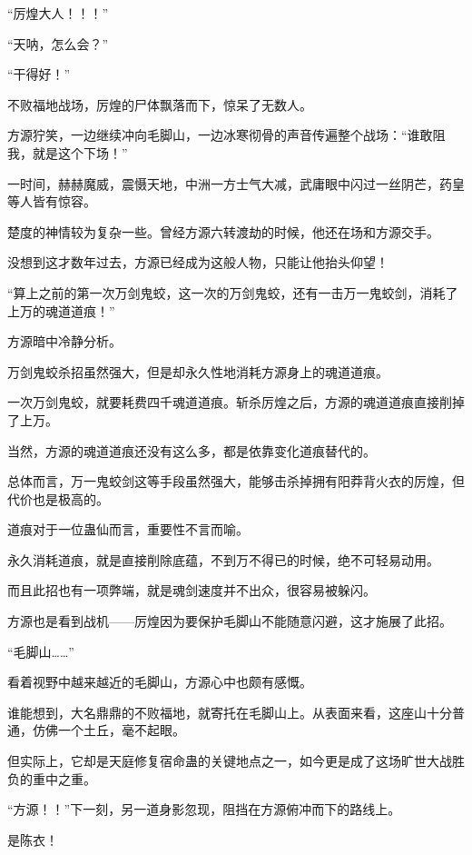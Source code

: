 
\begin{this_body}

“厉煌大人！！！”

“天呐，怎么会？”

“干得好！”

不败福地战场，厉煌的尸体飘落而下，惊呆了无数人。

方源狞笑，一边继续冲向毛脚山，一边冰寒彻骨的声音传遍整个战场：“谁敢阻我，就是这个下场！”

一时间，赫赫魔威，震慑天地，中洲一方士气大减，武庸眼中闪过一丝阴芒，药皇等人皆有惊容。

楚度的神情较为复杂一些。曾经方源六转渡劫的时候，他还在场和方源交手。

没想到这才数年过去，方源已经成为这般人物，只能让他抬头仰望！

“算上之前的第一次万剑鬼蛟，这一次的万剑鬼蛟，还有一击万一鬼蛟剑，消耗了上万的魂道道痕！”

方源暗中冷静分析。

万剑鬼蛟杀招虽然强大，但是却永久性地消耗方源身上的魂道道痕。

一次万剑鬼蛟，就要耗费四千魂道道痕。斩杀厉煌之后，方源的魂道道痕直接削掉了上万。

当然，方源的魂道道痕还没有这么多，都是依靠变化道痕替代的。

总体而言，万一鬼蛟剑这等手段虽然强大，能够击杀掉拥有阳莽背火衣的厉煌，但代价也是极高的。

道痕对于一位蛊仙而言，重要性不言而喻。

永久消耗道痕，就是直接削除底蕴，不到万不得已的时候，绝不可轻易动用。

而且此招也有一项弊端，就是魂剑速度并不出众，很容易被躲闪。

方源也是看到战机——厉煌因为要保护毛脚山不能随意闪避，这才施展了此招。

“毛脚山……”

看着视野中越来越近的毛脚山，方源心中也颇有感慨。

谁能想到，大名鼎鼎的不败福地，就寄托在毛脚山上。从表面来看，这座山十分普通，仿佛一个土丘，毫不起眼。

但实际上，它却是天庭修复宿命蛊的关键地点之一，如今更是成了这场旷世大战胜负的重中之重。

“方源！！”下一刻，另一道身影忽现，阻挡在方源俯冲而下的路线上。

是陈衣！


\end{this_body}
